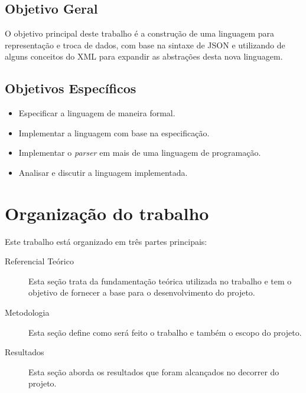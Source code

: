 \subsection{Objetivo Geral}

O objetivo principal deste trabalho é a construção de uma linguagem para
representação e troca de dados, com base na sintaxe de JSON e
utilizando de alguns conceitos do XML para expandir as abstrações 
desta nova linguagem.

\subsection{Objetivos Específicos}

\begin{itemize}
    \item Especificar a linguagem de maneira formal.
    \item Implementar a linguagem com base na especificação.
    \item Implementar o \textit{parser} em mais de uma linguagem de programação.
    \item Analisar e discutir a linguagem implementada.
\end{itemize}

\section{Organização do trabalho}

Este trabalho está organizado em três partes principais:

\begin{description}
    \item[Referencial Teórico] Esta seção trata da fundamentação teórica
    utilizada no trabalho e tem o objetivo de fornecer a base para o desenvolvimento 
    do projeto.
    \item[Metodologia] Esta seção define como será feito o trabalho e também
    o escopo do projeto.
    \item[Resultados] Esta seção aborda os resultados que foram alcançados no decorrer
    do projeto.
\end{description}